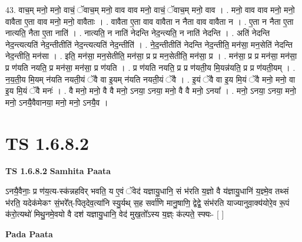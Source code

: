 \documentclass[17pt]{extarticle}
\begin{document}
43. वाच॒म् मनो॒ मनो॒ वाचं॒ ॅवाच॒म् मनो॒ वाव वाव मनो॒ वाचं॒ ॅवाच॒म् मनो॒ वाव । . मनो॒ वाव वाव मनो॒ मनो॒ वावैता ए॒ता वाव मनो॒ मनो॒ वावैताः । . वावैता ए॒ता वाव वावैता न नैता वाव वावैता न । . ए॒ता न नैता ए॒ता नात्यति॒ नैता ए॒ता नाति॑ । . नात्यति॒ न नाति॑ नेदन्ति नेद॒न्त्यति॒ न नाति॑ नेदन्ति । . अति॑ नेदन्ति नेद॒न्त्यत्यति॑ नेद॒न्तीतीति॑ नेद॒न्त्यत्यति॑ नेद॒न्तीति॑ । . ने॒द॒न्तीतीति॑ नेदन्ति नेद॒न्तीति॒ मन॑सा॒ मन॒सेति॑ नेदन्ति नेद॒न्तीति॒ मन॑सा । . इति॒ मन॑सा॒ मन॒सेतीति॒ मन॑सा॒ प्र प्र मन॒सेतीति॒ मन॑सा॒ प्र । . मन॑सा॒ प्र प्र मन॑सा॒ मन॑सा॒ प्र ण॑यति नयति॒ प्र मन॑सा॒ मन॑सा॒ प्र ण॑यति । . प्र ण॑यति नयति॒ प्र प्र ण॑यती॒य मि॒यन्न॑यति॒ प्र प्र ण॑यती॒यम् । . न॒य॒ती॒य मि॒यम् न॑यति नयती॒यं ॅवै वा इ॒यम् न॑यति नयती॒यं ॅवै । . इ॒यं ॅवै वा इ॒य मि॒यं ॅवै मनो॒ मनो॒ वा इ॒य मि॒यं ॅवै मनः॑ । . वै मनो॒ मनो॒ वै वै मनो॒ ऽनया॒ ऽनया॒ मनो॒ वै वै मनो॒ ऽनया᳚ । . मनो॒ ऽनया॒ ऽनया॒ मनो॒ मनो॒ ऽनयै॒वैवानया॒ मनो॒ मनो॒ ऽनयै॒व । \newline
\pagebreak
{}
\section*{ TS 1.6.8.2 }

\textbf{TS 1.6.8.2 } \newline
\textbf{Samhita Paata} \newline

ऽनयै॒वैनाः॒ प्र ण॑य॒त्य-स्क॑न्नहविर् भवति॒ य ए॒वं ॅवेद॑ यज्ञायु॒धानि॒ सं भ॑रति य॒ज्ञो वै य॑ज्ञायु॒धानि॑ य॒ज्ञ्मे॒व तथ्सं भ॑रति॒ यदेक॑मेकꣳ सं॒भरे᳚त्-पितृदेव॒त्या॑नि स्यु॒र्यथ् स॒ह सर्वा॑णि मानु॒षाणि॒ द्वेद्वे॒ संभ॑रति याज्यानुवा॒क्य॑योरे॒व रू॒पं क॑रो॒त्यथो॑ मिथु॒नमे॒वयो वै दश॑ यज्ञायु॒धानि॒ वेद॑ मुख॒तो᳚ऽस्य य॒ज्ञ्ः क॑ल्पते॒ स्फ्यः- [ ] \newline

\textbf{Pada Paata} \newline
\end{document}
